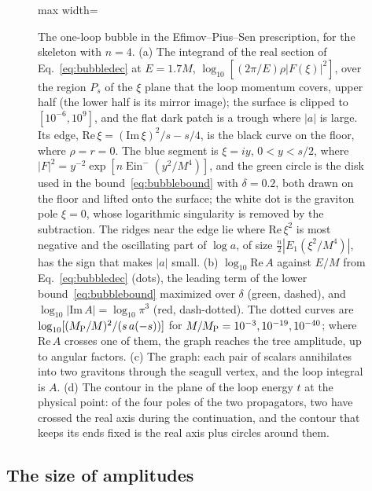 \documentclass[a4paper,11pt]{article}
\newcommand{\Ein}{\operatorname{Ein}}
\begin{document}
\begin{figure}[t]
\begin{adjustbox}{max width=\linewidth}
\end{adjustbox}
\caption{The one-loop bubble in the Efimov--Pius--Sen prescription, for the skeleton with $n=4$. (a) The integrand of the real section of Eq.~\eqref{eq:bubbledec} at $E=1.7M$, $\log_{10}[(2\pi/E)\rho|F(\xi)|^2]$, over the region $P_s$ of the $\xi$ plane that the loop momentum covers, upper half (the lower half is its mirror image); the surface is clipped to $[10^{-6},10^{9}]$, and the flat dark patch is a trough where $|a|$ is large. Its edge, $\mathrm{Re}\,\xi=(\mathrm{Im}\,\xi)^2/s-s/4$, is the black curve on the floor, where $\rho=r=0$. The blue segment is $\xi=iy$, $0<y<s/2$, where $|F|^2=y^{-2}\exp[n\Ein^-(y^2/M^4)]$, and the green circle is the disk used in the bound~\eqref{eq:bubblebound} with $\delta=0.2$, both drawn on the floor and lifted onto the surface; the white dot is the graviton pole $\xi=0$, whose logarithmic singularity is removed by the subtraction. The ridges near the edge lie where $\mathrm{Re}\,\xi^2$ is most negative and the oscillating part of $\log a$, of size $\frac n2|E_1(\xi^2/M^4)|$, has the sign that makes $|a|$ small. (b) $\log_{10}\mathrm{Re}\,A$ against $E/M$ from Eq.~\eqref{eq:bubbledec} (dots), the leading term of the lower bound~\eqref{eq:bubblebound} maximized over $\delta$ (green, dashed), and $\log_{10}|\mathrm{Im}\,A|=\log_{10}\pi^3$ (red, dash-dotted). The dotted curves are $\log_{10}[(M_{\rm P}/M)^2/(s\,a(-s))]$ for $M/M_{\rm P}=10^{-3},10^{-19},10^{-40}$; where $\mathrm{Re}\,A$ crosses one of them, the graph reaches the tree amplitude, up to angular factors. (c) The graph: each pair of scalars annihilates into two gravitons through the seagull vertex, and the loop integral is $A$. (d) The contour in the plane of the loop energy $t$ at the physical point: of the four poles of the two propagators, two have crossed the real axis during the continuation, and the contour that keeps its ends fixed is the real axis plus circles around them.}
\label{fig:bubble}
\end{figure}

\subsection{The size of amplitudes}
\label{sec:size}
\end{document}
